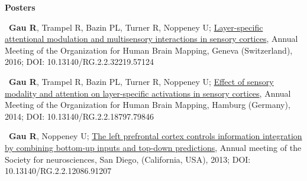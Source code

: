 \documentclass[a4paper,12pt,oneside]{letter}
\begin{document}
{\begin{center}
\large\textbf{Posters}
\end{center}

\textbullet~\textbf{Gau R}, Trampel R, Bazin PL, Turner R, Noppeney U; \href{http://www.researchgate.net/profile/Remi_Gau/publication/312040907_Layer-specific_attentional_modulation_and_multisensory_interactions_in_sensory_cortices/links/586bec8108ae8fce4919e07e.pdf?origin=publication_detail&ev=pub_int_prw_xdl&msrp=ebfE-ttTbrYfVzAofje5aX7FDjiW85HC3yqk8seJjhsOoLqmeRviQBtfDuXmv_czDArKxDp2vM32swxlbQzyvbVTbKL6xRpsEZ-BeqgslOo.KWD8vv500DrprbLnXSrDxinWDQrliScdbic1rjyyqLUG12KOwbjri9jbFDwSYWMkGLoSocKyAei7eQLoDCU9Dw.4eQVGmpcVG-AAQDI4KiYt-xA9SDkF_u7xvWOznoi52trnfagq5aJVIAgpfhgitdzt3LYuUPdJ8gE6jmG5I94Nw}{Layer-specific attentional modulation and multisensory interactions in sensory cortices}, Annual Meeting of the Organization for Human Brain Mapping, Geneva (Switzerland), 2016; DOI: 10.13140/RG.2.2.32219.57124

\textbullet~\textbf{Gau R}, Trampel R, Bazin PL, Turner R, Noppeney U; \href{http://www.researchgate.net/profile/Remi_Gau/publication/312040995_Effect_of_sensory_modality_and_attention_on_layer-specific_activations_in_sensory_cortices/links/586bef4108ae329d621216ff.pdf?origin=publication_detail&ev=pub_int_prw_xdl&msrp=rWGQkC7vAu_P6H2YxCI3M31egmAPzpbXdoRN1OdTlFE2ytvRyytc2DItV2mPnvlGPXAOT-Q0hOx0cWKEfhvF_ZK7oOzQtXTOX1cxj1f7wdc.EjFU3lhxIUR_qptyNrCYqZDXVg6nG7zWe8VL0WxLSdSMUGnjz_v4L5Yov-RWctdEwDPFRXLasy1FBdCk7Dlydw.IANTdlTw5MPB88HQJNdTi7lFv6Sygddbknct3mMTSsgH20heYrYcKnbsQLxtcsNd-HHWZUEIEP4-7bkQLNDUhQ}{Effect of sensory modality and attention on layer-specific activations in sensory cortices}, Annual Meeting of the Organization for Human Brain Mapping, Hamburg (Germany), 2014; DOI: 10.13140/RG.2.2.18797.79846

\textbullet~\textbf{Gau R}, Noppeney U; \href{http://www.researchgate.net/profile/Remi_Gau/publication/312040995_Effect_of_sensory_modality_and_attention_on_layer-specific_activations_in_sensory_cortices/links/586bef4108ae329d621216ff.pdf?origin=publication_detail&ev=pub_int_prw_xdl&msrp=rWGQkC7vAu_P6H2YxCI3M31egmAPzpbXdoRN1OdTlFE2ytvRyytc2DItV2mPnvlGPXAOT-Q0hOx0cWKEfhvF_ZK7oOzQtXTOX1cxj1f7wdc.EjFU3lhxIUR_qptyNrCYqZDXVg6nG7zWe8VL0WxLSdSMUGnjz_v4L5Yov-RWctdEwDPFRXLasy1FBdCk7Dlydw.IANTdlTw5MPB88HQJNdTi7lFv6Sygddbknct3mMTSsgH20heYrYcKnbsQLxtcsNd-HHWZUEIEP4-7bkQLNDUhQ}{The left prefrontal cortex controls information integration by combining bottom-up inputs and top-down predictions}, Annual meeting of the Society for neurosciences, San Diego, (California, USA), 2013; DOI: 10.13140/RG.2.2.12086.91207

}
\end{document}
